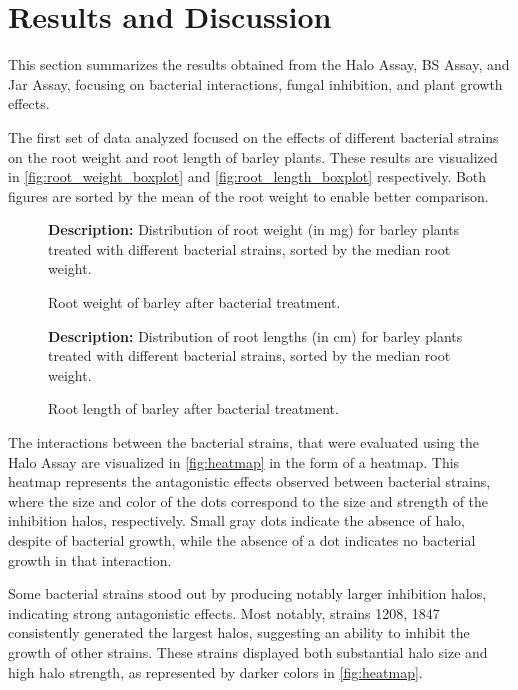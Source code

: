 \section{Results and Discussion}

This section summarizes the results obtained from the Halo Assay, BS Assay, and Jar Assay, focusing on bacterial interactions, fungal inhibition, and plant growth effects.

\par
The first set of data analyzed focused on the effects of different bacterial strains on the root weight and root length of barley plants. These results are visualized in \autoref{fig:root_weight_boxplot} and \autoref{fig:root_length_boxplot} respectively.
Both figures are sorted by the mean of the root weight to enable better comparison. 


\begin{figure}[H]
    \centering
    
    \caption{Root weight of barley after bacterial treatment.}
    \medskip
    \textbf{Description:} Distribution of root weight (in mg) for barley plants treated with different bacterial strains, sorted by the median root weight.
    \label{fig:root_weight_boxplot}
\end{figure}%

\begin{figure}[H]
    \centering
    
    \caption{Root length of barley after bacterial treatment.}
    \medskip
    \textbf{Description:} Distribution of root lengths (in cm) for barley plants treated with different bacterial strains, sorted by the median root weight.
    \label{fig:root_length_boxplot}
\end{figure}


The interactions between the bacterial strains, that were evaluated using the Halo Assay are visualized in \autoref{fig:heatmap} in the form of a heatmap. 
This heatmap represents the antagonistic effects observed between bacterial strains, where the size and color of the dots correspond to the size and strength of the inhibition halos, respectively. Small gray dots indicate the absence of halo, despite of bacterial growth, while the absence of a dot indicates no bacterial growth in that interaction. 

Some bacterial strains stood out by producing notably larger inhibition halos, indicating strong antagonistic effects. Most notably, strains 1208, 1847 consistently generated the largest halos, suggesting an ability to inhibit the growth of other strains. These strains displayed both substantial halo size and high halo strength, as represented by darker colors in \autoref{fig:heatmap}.

